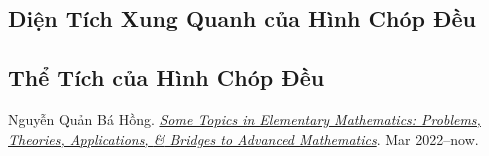 \documentclass{article}
\numberwithin{equation}{section}
\begin{document}
\subsection{Diện Tích Xung Quanh của Hình Chóp Đều}

\subsection{Thể Tích của Hình Chóp Đều}


\begin{thebibliography}{99}
	 Nguyễn Quản Bá Hồng. \href{https://github.com/NQBH/hobby/blob/master/elementary_mathematics/NQBH_elementary_mathematics.pdf}{\textit{Some Topics in Elementary Mathematics: Problems, Theories, Applications, \textit{\&} Bridges to Advanced Mathematics}}. Mar 2022--now.
\end{thebibliography}


\printbibliography[heading=bibintoc]
	
\end{document}
